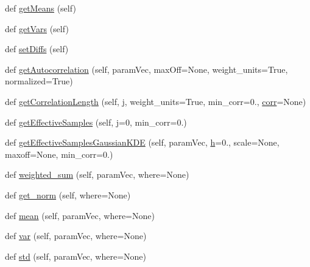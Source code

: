 \begin{DoxyCompactItemize}
\item 
def \mbox{\hyperlink{classgetdist_1_1chains_1_1WeightedSamples_aa5d70ded54742f3296cd856a8a1fa185}{get\+Means}} (self)
\item 
def \mbox{\hyperlink{classgetdist_1_1chains_1_1WeightedSamples_ad18581999b99b52a6e0e7a5b587e0208}{get\+Vars}} (self)
\item 
def \mbox{\hyperlink{classgetdist_1_1chains_1_1WeightedSamples_aa76342740cc0252dbaa1ebbd8e254853}{set\+Diffs}} (self)
\item 
def \mbox{\hyperlink{classgetdist_1_1chains_1_1WeightedSamples_a3635437a603d5c30394f83039c821859}{get\+Autocorrelation}} (self, param\+Vec, max\+Off=None, weight\+\_\+units=True, normalized=True)
\item 
def \mbox{\hyperlink{classgetdist_1_1chains_1_1WeightedSamples_ab8aaeca64fdb6cd42357a45118901526}{get\+Correlation\+Length}} (self, \mbox{\hyperlink{plotcls_8m_ac86694252f8dfdb19aaeadc4b7c342c6}{j}}, weight\+\_\+units=True, min\+\_\+corr=0., \mbox{\hyperlink{classgetdist_1_1chains_1_1WeightedSamples_ad7fc11d463b6ebe773ecd156e7e7bcce}{corr}}=None)
\item 
def \mbox{\hyperlink{classgetdist_1_1chains_1_1WeightedSamples_a2a9c6bc9d303e07c06cd8d44a6c67838}{get\+Effective\+Samples}} (self, \mbox{\hyperlink{plotcls_8m_ac86694252f8dfdb19aaeadc4b7c342c6}{j}}=0, min\+\_\+corr=0.)
\item 
def \mbox{\hyperlink{classgetdist_1_1chains_1_1WeightedSamples_acc6bb1ecddcbbfa0f9db00442ccc380b}{get\+Effective\+Samples\+Gaussian\+K\+DE}} (self, param\+Vec, \mbox{\hyperlink{plotTT_8m_aed4baa87751a8ac3167e69443cdc6241}{h}}=0., scale=None, maxoff=None, min\+\_\+corr=0.)
\item 
def \mbox{\hyperlink{classgetdist_1_1chains_1_1WeightedSamples_afdeb6d07f1db505f36fe0ca0052528ac}{weighted\+\_\+sum}} (self, param\+Vec, where=None)
\item 
def \mbox{\hyperlink{classgetdist_1_1chains_1_1WeightedSamples_adb6da75221743f7a05286cbb2b2685b0}{get\+\_\+norm}} (self, where=None)
\item 
def \mbox{\hyperlink{classgetdist_1_1chains_1_1WeightedSamples_a72a6f011746d852ea089302d90f59159}{mean}} (self, param\+Vec, where=None)
\item 
def \mbox{\hyperlink{classgetdist_1_1chains_1_1WeightedSamples_a0ee200487592ebb5723da33f43724e4f}{var}} (self, param\+Vec, where=None)
\item 
def \mbox{\hyperlink{classgetdist_1_1chains_1_1WeightedSamples_aeaa6411b75fd033e7ad9761cdcbc28cf}{std}} (self, param\+Vec, where=None)

\end{DoxyCompactItemize}
